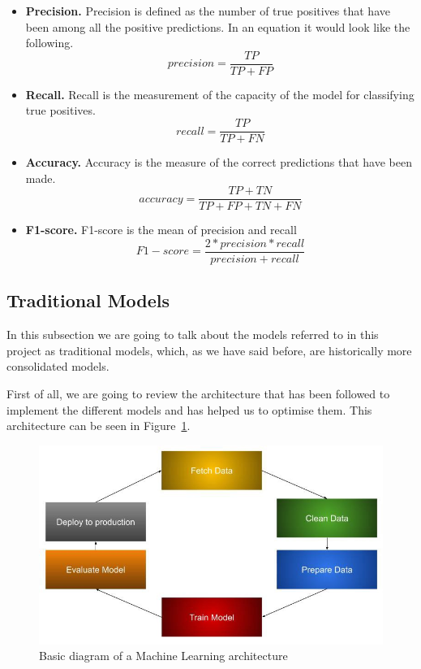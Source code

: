 \begin{itemize}
    \item \textbf{Precision.} Precision is defined as the number of true positives that have been among all the positive predictions. In an equation it would look like the following.
    \begin{equation}
        precision = \frac{TP}{TP + FP} 
    \end{equation}
    \item \textbf{Recall.} Recall is the measurement of the capacity of the model for classifying true positives.
    \begin{equation}
        recall = \frac{TP}{TP + FN} 
    \end{equation}
    \item \textbf{Accuracy.} Accuracy is the measure of the correct predictions that have been made.
    \begin{equation}
        accuracy = \frac{TP + TN}{TP + FP + TN + FN} 
    \end{equation}
    \item \textbf{F1-score.} F1-score is the mean of precision and recall
    \begin{equation}
        F1-score = \frac{2 * precision * recall}{precision + recall} 
    \end{equation}
    
\end{itemize}

\label{sec:models}
\subsection{Traditional Models}

In this subsection we are going to talk about the models referred to in this project as traditional models, which, as we have said before, are historically more consolidated models.

First of all, we are going to review the architecture that has been followed to implement the different models and has helped us to optimise them. This architecture can be seen in Figure~\ref{fig:mlarchitecture}.


\begin{figure}[!htp]
    \centering
    \includegraphics[scale=0.55]{img/detection/mlarchitecture.jpeg}
    \caption{Basic diagram of a Machine Learning architecture}
    \label{fig:mlarchitecture}
\end{figure}

